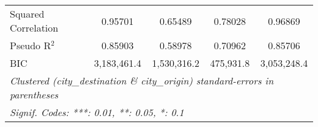 \begin{tabular}{lcccc}
   Squared Correlation               & 0.95701                        & 0.65489                           & 0.78028                       & 0.96869\\  
   Pseudo R$^2$                      & 0.85903                        & 0.58978                           & 0.70962                       & 0.85706\\  
   BIC                               & 3,183,461.4                    & 1,530,316.2                       & 475,931.8                     & 3,053,248.4\\  
   \midrule \midrule
   \multicolumn{5}{l}{\emph{Clustered (city\_destination \& city\_origin) standard-errors in parentheses}}\\
   \multicolumn{5}{l}{\emph{Signif. Codes: ***: 0.01, **: 0.05, *: 0.1}}\\
\end{tabular}
\par\endgroup


